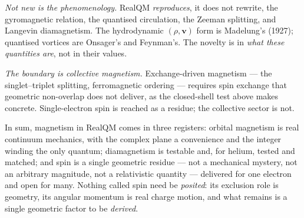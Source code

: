 \emph{Not new is the phenomenology.} RealQM \emph{reproduces}, it does not rewrite, the gyromagnetic relation, the
quantised circulation, the Zeeman splitting, and Langevin diamagnetism. The hydrodynamic $(\rho, \mathbf{v})$
form is Madelung's (1927); quantised vortices are Onsager's and Feynman's. The novelty is in \emph{what these
quantities are}, not in their values.

\emph{The boundary is collective magnetism.} Exchange-driven magnetism --- the singlet--triplet splitting,
ferromagnetic ordering --- requires spin exchange that geometric non-overlap does not deliver, as the
closed-shell test above makes concrete. Single-electron spin is reached as a residue; the collective sector is
not.

In sum, magnetism in RealQM comes in three registers: orbital magnetism is real continuum mechanics, with the
complex plane a convenience and the integer winding the only quantum; diamagnetism is testable and, for helium,
tested and matched; and spin is a single geometric residue --- not a mechanical mystery, not an arbitrary
magnitude, not a relativistic quantity --- delivered for one electron and open for many. Nothing called spin need
be \emph{posited}: its exclusion role is geometry, its angular momentum is real charge motion, and what remains is
a single geometric factor to be \emph{derived}.

